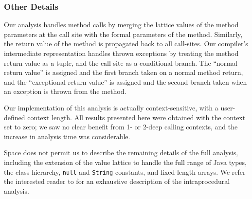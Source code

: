 \documentclass{sig-alt-full}
\begin{document}
\subsubsection{Other Details}
Our analysis handles method calls by merging the lattice values of the
method parameters at the call site with the formal parameters of the
method.  Similarly, the return value of the method is propagated back
to all call-sites.  Our compiler's intermediate representation handles
thrown exceptions by treating the method return value as a tuple, and
the call site as a conditional branch.  The ``normal return value'' is
assigned and the first branch taken on a normal method return, and the
``exceptional return value'' is assigned and the second branch taken when an
exception is thrown from the method.

Our implementation of this analysis is actually context-sensitive,
with a user-defined context length.  All results presented here were
obtained with the context set to zero; we saw no clear benefit from 1-
or 2-deep calling contexts, and the increase in analysis
time was considerable.

Space does not permit us to describe the remaining details of the full
analysis, including the extension of the value
lattice to handle the full range of Java types, the class hierarchy,
{\tt null} and {\tt String} constants, and fixed-length arrays.
We refer the interested reader to \cite{ananian99:tech} for an
exhaustive description of the intraprocedural analysis.
\end{document}
